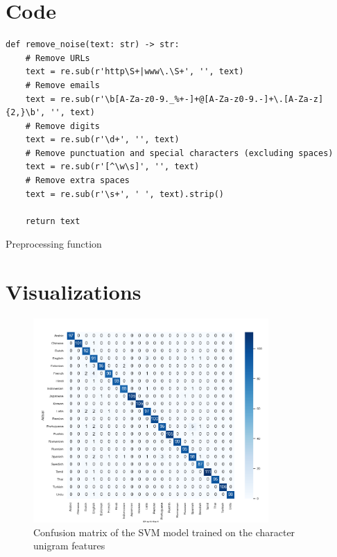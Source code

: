 \appendix
\section{Code}

\begin{listing}[h]
    \centering
    \begin{minipage}{0.9\textwidth}
        \begin{verbatim}
def remove_noise(text: str) -> str:
    # Remove URLs
    text = re.sub(r'http\S+|www\.\S+', '', text)
    # Remove emails
    text = re.sub(r'\b[A-Za-z0-9._%+-]+@[A-Za-z0-9.-]+\.[A-Za-z]{2,}\b', '', text)
    # Remove digits
    text = re.sub(r'\d+', '', text)
    # Remove punctuation and special characters (excluding spaces)
    text = re.sub(r'[^\w\s]', '', text)
    # Remove extra spaces
    text = re.sub(r'\s+', ' ', text).strip()

    return text
        \end{verbatim}
    \end{minipage}
    \caption{Preprocessing function}
    \label{lst:preprocessing}
\end{listing}

\section{Visualizations}

\begin{figure}[h]
    \centering
    \includegraphics[width=0.8\textwidth]{figures/svm_char_unigram_val_set_matrix.png}
    \caption{Confusion matrix of the SVM model trained on the character unigram features}
    \label{fig:matrix_svm_char_unigram}
\end{figure}

